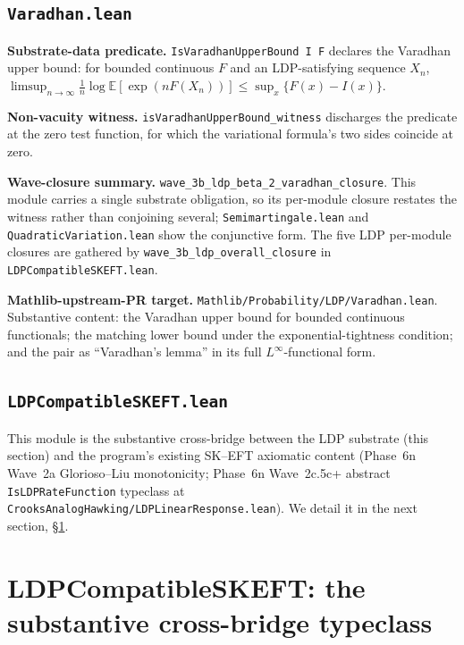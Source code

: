\documentclass[11pt]{article}
\begin{document}
\subsection{\texttt{Varadhan.lean}}

\textbf{Substrate-data predicate.}
\texttt{IsVaradhanUpperBound I F} declares the Varadhan
upper bound: for bounded continuous $F$ and an LDP-satisfying
sequence $X_n$,
$\limsup_{n\to\infty} \frac{1}{n} \log \mathbb{E}[\exp(n F(X_n))]
\leq \sup_x \{F(x) - I(x)\}$.

\textbf{Non-vacuity witness.}
\texttt{isVaradhanUpperBound\_witness} discharges the predicate at the zero test function, for which the variational formula's two sides coincide at zero.

\textbf{Wave-closure summary.}
\texttt{wave\_3b\_ldp\_beta\_2\_varadhan\_closure}. This module carries a single substrate obligation, so
its per-module closure restates the witness rather than conjoining
several; \texttt{Semimartingale.lean} and
\texttt{QuadraticVariation.lean} show the conjunctive form. The five
LDP per-module closures are gathered by
\texttt{wave\_3b\_ldp\_overall\_closure} in
\texttt{LDPCompatibleSKEFT.lean}.

\textbf{Mathlib-upstream-PR target.}
\texttt{Mathlib/Probability/LDP/Varadhan.lean}.
Substantive content: the Varadhan upper bound for bounded
continuous functionals; the matching lower bound under the
exponential-tightness condition; and the pair as ``Varadhan's
lemma'' in its full $L^\infty$-functional form.

\subsection{\texttt{LDPCompatibleSKEFT.lean}}

This module is the substantive cross-bridge between the LDP substrate
(this section) and the program's existing SK--EFT axiomatic content
(Phase~6n Wave~2a Glorioso--Liu monotonicity; Phase~6n Wave~2c.5c+
abstract \texttt{IsLDPRateFunction} typeclass at
\texttt{CrooksAnalogHawking/LDPLinearResponse.lean}). We detail it
in the next section, \S\ref{sec:ldp-compatible-skeft}.


\section{LDPCompatibleSKEFT: the substantive cross-bridge typeclass}
\label{sec:ldp-compatible-skeft}
\end{document}
